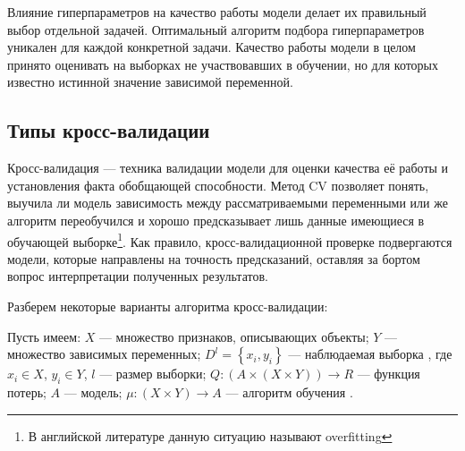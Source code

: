 \documentclass[a4paper, 14pt]{article}
\begin{document}
Влияние гиперпараметров на качество работы модели делает их правильный выбор отдельной задачей. Оптимальный алгоритм подбора гиперпараметров уникален для каждой конкретной задачи. Качество работы модели в целом принято оценивать на выборках не участвовавших в обучении, но для которых известно истинной значение зависимой переменной. 

\subsection{Типы кросс-валидации}
Кросс-валидация --- техника валидации модели для оценки качества её работы и установления факта обобщающей способности. Метод CV позволяет понять, выучила ли модель зависимость между рассматриваемыми переменными или же алгоритм переобучился и хорошо предсказывает лишь данные имеющиеся в обучающей выборке\footnote{В английской литературе данную ситуацию называют 	overfitting}. Как правило, кросс-валидационной проверке подвергаются модели, которые направлены на точность предсказаний, оставляя за бортом вопрос интерпретации полученных результатов.  

\noindent Разберем некоторые варианты алгоритма кросс-валидации:

\noindent Пусть имеем: $X$ --- множество признаков, описывающих объекты; $Y$ --- множество зависимых переменных; $D^l = \left\{x_i, y_i\right\}$ --- наблюдаемая выборка , где $x_i \in X$, $y_i \in Y$, $l$ --- размер выборки; $Q : (A \times (X \times Y ) )  \rightarrow R$ --- функция потерь; $A$ --- модель; $\mu : (X \times Y) \rightarrow A$ --- алгоритм обучения \cite{ifmocv}.
\end{document}
